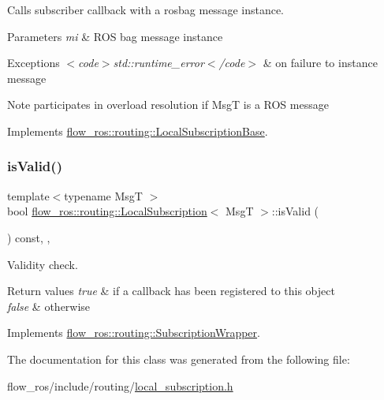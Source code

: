 Calls subscriber callback with a rosbag message instance. 


\begin{DoxyParams}{Parameters}
{\em mi} & R\+OS bag message instance\\
\hline
\end{DoxyParams}

\begin{DoxyExceptions}{Exceptions}
{\em $<$code$>$std\+::runtime\+\_\+error$<$/code$>$} & on failure to instance message \\
\hline
\end{DoxyExceptions}
\begin{DoxyNote}{Note}
participates in overload resolution if {\ttfamily MsgT} is a R\+OS message 
\end{DoxyNote}


Implements \hyperlink{classflow__ros_1_1routing_1_1_local_subscription_base_aa2742e8cb1bd70ed0fd6fab679853a7c}{flow\+\_\+ros\+::routing\+::\+Local\+Subscription\+Base}.

\mbox{\label{classflow__ros_1_1routing_1_1_local_subscription_ac6fd67afc41be35f69ede7ca5fd8dcfa}} 
\subsubsection{\texorpdfstring{is\+Valid()}{isValid()}}
{\footnotesize\ttfamily template$<$typename MsgT $>$ \\
bool \hyperlink{classflow__ros_1_1routing_1_1_local_subscription}{flow\+\_\+ros\+::routing\+::\+Local\+Subscription}$<$ MsgT $>$\+::is\+Valid (\begin{DoxyParamCaption}{ }\end{DoxyParamCaption}) const\hspace{0.3cm}{\ttfamily [inline]}, {\ttfamily [override]}, {\ttfamily [virtual]}}



Validity check. 


\begin{DoxyRetVals}{Return values}
{\em true} & if a callback has been registered to this object \\
\hline
{\em false} & otherwise \\
\hline
\end{DoxyRetVals}


Implements \hyperlink{classflow__ros_1_1routing_1_1_subscription_wrapper_a0f23052807c3533d28168d7c681a221e}{flow\+\_\+ros\+::routing\+::\+Subscription\+Wrapper}.



The documentation for this class was generated from the following file\+:\begin{DoxyCompactItemize}
\item 
flow\+\_\+ros/include/routing/\hyperlink{local__subscription_8h}{local\+\_\+subscription.\+h}\end{DoxyCompactItemize}
